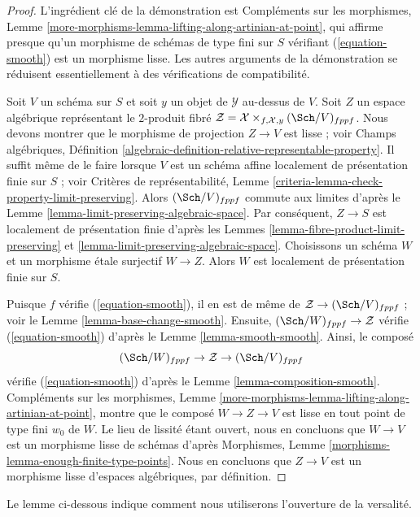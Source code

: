 \begin{proof}
L'ingrédient clé de la démonstration est Compléments sur les morphismes, Lemme
\ref{more-morphisms-lemma-lifting-along-artinian-at-point},
qui affirme presque qu'un morphisme de schémas de type fini sur $S$
vérifiant (\ref{equation-smooth}) est un morphisme lisse. Les autres
arguments de la démonstration se réduisent essentiellement à des vérifications de compatibilité.

\medskip\noindent
Soit $V$ un schéma sur $S$ et soit $y$ un objet de $\mathcal{Y}$ au-dessus de
$V$. Soit $Z$ un espace algébrique représentant le $2$-produit fibré
$\mathcal{Z} = \mathcal{X} \times_{f, \mathcal{X}, y} (\Sch/V)_{fppf}$.
Nous devons montrer que le morphisme de projection $Z \to V$ est lisse ; voir
Champs algébriques, Définition
\ref{algebraic-definition-relative-representable-property}.
Il suffit même de le faire lorsque $V$ est un schéma affine
localement de présentation finie sur $S$ ; voir
Critères de représentabilité, Lemme
\ref{criteria-lemma-check-property-limit-preserving}.
Alors $(\Sch/V)_{fppf}$ commute aux limites d'après le
Lemme \ref{lemma-limit-preserving-algebraic-space}.
Par conséquent, $Z \to S$ est localement de présentation finie d'après les
Lemmes \ref{lemma-fibre-product-limit-preserving} et
\ref{lemma-limit-preserving-algebraic-space}.
Choisissons un schéma $W$ et un morphisme \'etale surjectif $W \to Z$.
Alors $W$ est localement de présentation finie sur $S$.

\medskip\noindent
Puisque $f$ vérifie (\ref{equation-smooth}), il en est de même de
$\mathcal{Z} \to (\Sch/V)_{fppf}$ ; voir le Lemme \ref{lemma-base-change-smooth}.
Ensuite, $(\Sch/W)_{fppf} \to \mathcal{Z}$ vérifie
(\ref{equation-smooth}) d'après le Lemme \ref{lemma-smooth-smooth}.
Ainsi, le composé
$$
(\Sch/W)_{fppf} \to \mathcal{Z} \to (\Sch/V)_{fppf}
$$
vérifie (\ref{equation-smooth}) d'après le Lemme \ref{lemma-composition-smooth}.
Compléments sur les morphismes, Lemme
\ref{more-morphisms-lemma-lifting-along-artinian-at-point},
montre que le composé $W \to Z \to V$ est lisse en tout point de type fini
$w_0$ de $W$. Le lieu de lissité étant ouvert, nous en concluons
que $W \to V$ est un morphisme lisse de schémas d'après
Morphismes, Lemme \ref{morphisms-lemma-enough-finite-type-points}.
Nous en concluons que $Z \to V$ est un morphisme lisse
d'espaces algébriques, par définition.
\end{proof}

\noindent
Le lemme ci-dessous indique comment nous utiliserons l'ouverture de la versalité.


